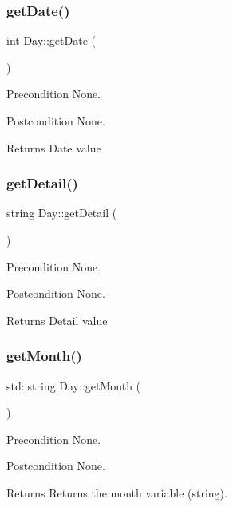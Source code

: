 \subsubsection{\texorpdfstring{get\+Date()}{getDate()}}
{\footnotesize\ttfamily int Day\+::get\+Date (\begin{DoxyParamCaption}{ }\end{DoxyParamCaption})}

\begin{DoxyPrecond}{Precondition}
None. 
\end{DoxyPrecond}
\begin{DoxyPostcond}{Postcondition}
None. 
\end{DoxyPostcond}
\begin{DoxyReturn}{Returns}
Date value 
\end{DoxyReturn}
\hypertarget{class_day_adf187d211b1ea4561832486f7094b18b}{}\label{class_day_adf187d211b1ea4561832486f7094b18b} 
\subsubsection{\texorpdfstring{get\+Detail()}{getDetail()}}
{\footnotesize\ttfamily string Day\+::get\+Detail (\begin{DoxyParamCaption}{ }\end{DoxyParamCaption})}

\begin{DoxyPrecond}{Precondition}
None. 
\end{DoxyPrecond}
\begin{DoxyPostcond}{Postcondition}
None. 
\end{DoxyPostcond}
\begin{DoxyReturn}{Returns}
Detail value 
\end{DoxyReturn}
\hypertarget{class_day_ae10fc576ccdf6d58ef42c8cd1b371401}{}\label{class_day_ae10fc576ccdf6d58ef42c8cd1b371401} 
\subsubsection{\texorpdfstring{get\+Month()}{getMonth()}}
{\footnotesize\ttfamily std\+::string Day\+::get\+Month (\begin{DoxyParamCaption}{ }\end{DoxyParamCaption})}

\begin{DoxyPrecond}{Precondition}
None. 
\end{DoxyPrecond}
\begin{DoxyPostcond}{Postcondition}
None. 
\end{DoxyPostcond}
\begin{DoxyReturn}{Returns}
Returns the month variable (string). 
\end{DoxyReturn}
\hypertarget{class_day_ac0d1e5a970de4e30bc563c33cf69cbc3}{}\label{class_day_ac0d1e5a970de4e30bc563c33cf69cbc3} 
